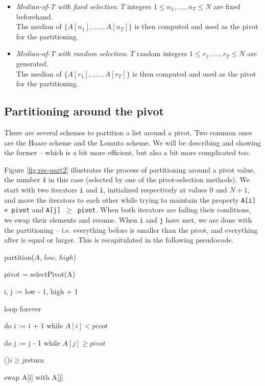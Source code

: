 \documentclass[]{finalproject}
\begin{document}
\begin{itemize}
\item \textit{Median-of-T with fixed selection}: $T$ integers $1 \leq n_{1},....,n_{T} \leq N$ are fixed beforehand. \\
The median of $\{A[n_{1}],.....,A[n_{T}]\}$ is then computed and used as the pivot for the partitioning.
\item \textit{Median-of-T with random selection}: $T$ random integers $1 \leq r_{1},....,r_{T} \leq N$ are generated. \\
The median of $\{A[r_{1}],.....,A[r_{T}]\}$ is then computed and used as the pivot for the partitioning.
\end{itemize}

\subsection{Partitioning around the pivot}
There are several schemes to partition a list around a pivot. Two common ones are the Hoare scheme and the Lomuto scheme. We will be describing and showing the former -- which is a bit more efficient, but also a bit more complicated too.

Figure \ref{fig:rec-part2} illustrates the process of partitioning around a pivot value, the number 4 in this case (selected by one of the pivot-selection methods). We start with two iterators \texttt{i} and \texttt{i}, initialized respectively at values $0$ and $N+1$, and move the iterators to each other while trying to maintain the property \texttt{A[i] < pivot} and \texttt{A[j] $\geq$ pivot}. When both iterators are failing their conditions, we swap their elements and resume. When \texttt{i} and \texttt{j} have met, we are done with the partitioning -- i.e. everything before is smaller than the pivot, and everything after is equal or larger. This is recapitulated in the following pseudocode.

\begin{algorithm}
\caption{partition($A$, $low$, $high$)}
\label{alg:p2}

pivot = selectPivot(A)

i, j := low - 1, high + 1

loop forever

\Indp

do i := i + 1 while $A[i] < pivot$

do j := j - 1 while $A[j] \geq pivot$

\If(){$i \geq j$}{return}

swap A[i] with A[j]
\end{algorithm}
\end{document}
